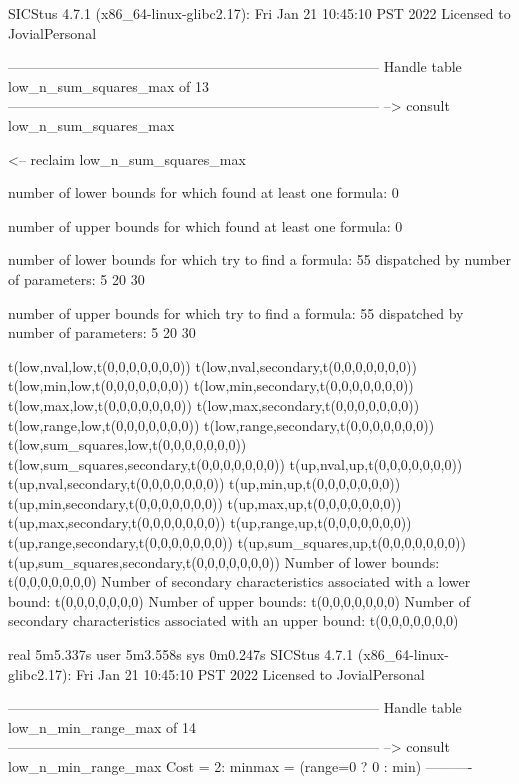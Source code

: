 SICStus 4.7.1 (x86_64-linux-glibc2.17): Fri Jan 21 10:45:10 PST 2022
Licensed to JovialPersonal


--------------------------------------------------------------------------------
Handle table low_n_sum_squares_max of 13
--------------------------------------------------------------------------------
--> consult low_n_sum_squares_max

<-- reclaim low_n_sum_squares_max

number of lower bounds for which found at least one formula: 0

number of upper bounds for which found at least one formula: 0

number of lower bounds for which try to find a formula: 55
dispatched by number of parameters: 5  20  30

number of upper bounds for which try to find a formula: 55
dispatched by number of parameters: 5  20  30

t(low,nval,low,t(0,0,0,0,0,0,0))
t(low,nval,secondary,t(0,0,0,0,0,0,0))
t(low,min,low,t(0,0,0,0,0,0,0))
t(low,min,secondary,t(0,0,0,0,0,0,0))
t(low,max,low,t(0,0,0,0,0,0,0))
t(low,max,secondary,t(0,0,0,0,0,0,0))
t(low,range,low,t(0,0,0,0,0,0,0))
t(low,range,secondary,t(0,0,0,0,0,0,0))
t(low,sum_squares,low,t(0,0,0,0,0,0,0))
t(low,sum_squares,secondary,t(0,0,0,0,0,0,0))
t(up,nval,up,t(0,0,0,0,0,0,0))
t(up,nval,secondary,t(0,0,0,0,0,0,0))
t(up,min,up,t(0,0,0,0,0,0,0))
t(up,min,secondary,t(0,0,0,0,0,0,0))
t(up,max,up,t(0,0,0,0,0,0,0))
t(up,max,secondary,t(0,0,0,0,0,0,0))
t(up,range,up,t(0,0,0,0,0,0,0))
t(up,range,secondary,t(0,0,0,0,0,0,0))
t(up,sum_squares,up,t(0,0,0,0,0,0,0))
t(up,sum_squares,secondary,t(0,0,0,0,0,0,0))
Number of lower bounds:                                             t(0,0,0,0,0,0,0)
Number of secondary characteristics associated with a lower bound:  t(0,0,0,0,0,0,0)
Number of upper bounds:                                             t(0,0,0,0,0,0,0)
Number of secondary characteristics associated with an upper bound: t(0,0,0,0,0,0,0)

real	5m5.337s
user	5m3.558s
sys	0m0.247s
SICStus 4.7.1 (x86_64-linux-glibc2.17): Fri Jan 21 10:45:10 PST 2022
Licensed to JovialPersonal


--------------------------------------------------------------------------------
Handle table low_n_min_range_max of 14
--------------------------------------------------------------------------------
--> consult low_n_min_range_max
Cost =  2:  minmax = (range=0 ? 0 : min)
----------

